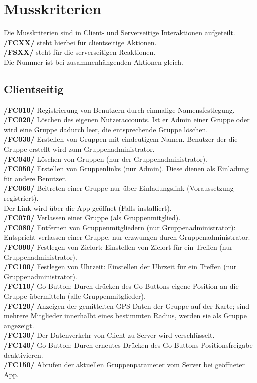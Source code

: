 \newpage
\section{Musskriterien}
Die Musskriterien sind in Client- und Serverseitige Interaktionen aufgeteilt.\\
\textbf{/FCXX/} steht hierbei für clientseitige Aktionen.\\
\textbf{/FSXX/} steht für die serverseitigen Reaktionen.\\
Die Nummer ist bei zusammenhängenden Aktionen gleich.\\
\subsection{Clientseitig}
     \textbf{/FC010/} Registrierung von Benutzern durch einmalige Namensfestlegung.\\
     \textbf{/FC020/} Löschen des eigenen Nutzeraccounts. Ist er Admin einer Gruppe oder wird eine Gruppe dadurch leer, die entsprechende Gruppe löschen.\\
     \textbf{/FC030/} Erstellen von Gruppen mit eindeutigem Namen. Benutzer der die Gruppe erstellt wird zum Gruppenadministrator.\\
     \textbf{/FC040/} Löschen von Gruppen (nur der Gruppenadministrator).\\
     \textbf{/FC050/} Erstellen von Gruppenlinks (nur Admin). Diese dienen als Einladung für andere Benutzer.\\
     \textbf{/FC060/} Beitreten einer Gruppe nur über Einladungslink (Voraussetzung registriert).\\
     Der Link wird über die App geöffnet (Falls installiert).\\
     \textbf{/FC070/} Verlassen einer Gruppe (als Gruppenmitglied).\\
     \textbf{/FC080/} Entfernen von Gruppenmitgliedern (nur Gruppenadministrator): Entspricht verlassen einer Gruppe, nur erzwungen durch Gruppenadministrator.\\
     \textbf{/FC090/} Festlegen von Zielort: Einstellen von Zielort für ein Treffen (nur Gruppenadministrator).\\
     \textbf{/FC100/} Festlegen von Uhrzeit: Einstellen der Uhrzeit für ein Treffen (nur Gruppenadministrator).\\
     \textbf{/FC110/} Go-Button: Durch drücken des Go-Buttons eigene Position an die Gruppe übermitteln (alle Gruppenmitglieder).\\
     \textbf{/FC120/} Anzeigen der gemittelten GPS-Daten der Gruppe auf der Karte; sind mehrere Mitglieder innerhalbt eines bestimmten Radius,
     werden sie als Gruppe angezeigt.\\
     \textbf{/FC130/} Der Datenverkehr von Client zu Server wird verschlüsselt.\\
     \textbf{/FC140/} Go-Button: Durch erneutes Drücken des Go-Buttons Positionsfreigabe deaktivieren.\\
     \textbf{/FC150/} Abrufen der aktuellen Gruppenparameter vom Server bei geöffneter App.\\
